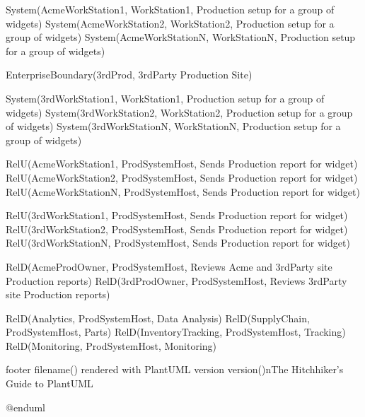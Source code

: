 \documentclass[letterpaper,10pt,english]{sphinxmanual}
\begin{document}
\begin{sphinxVerbatim}[commandchars=\\\{\},numbers=left,firstnumber=1,stepnumber=1]
    System(AcmeWorkStation1, \PYGZdq{}WorkStation1\PYGZdq{}, \PYGZdq{} Production setup for a group of widgets\PYGZdq{})    
    System(AcmeWorkStation2, \PYGZdq{}WorkStation2\PYGZdq{}, \PYGZdq{} Production setup for a group of widgets\PYGZdq{})        
    System(AcmeWorkStationN, \PYGZdq{}WorkStationN\PYGZdq{}, \PYGZdq{} Production setup for a group of widgets\PYGZdq{})        

\PYGZcb{}


Enterprise\PYGZus{}Boundary(3rdProd, \PYGZdq{}3rdParty Production Site\PYGZdq{}) \PYGZob{}


    System(3rdWorkStation1, \PYGZdq{}WorkStation1\PYGZdq{}, \PYGZdq{} Production setup for a group of widgets\PYGZdq{})    
    System(3rdWorkStation2, \PYGZdq{}WorkStation2\PYGZdq{}, \PYGZdq{} Production setup for a group of widgets\PYGZdq{})        
    System(3rdWorkStationN, \PYGZdq{}WorkStationN\PYGZdq{}, \PYGZdq{} Production setup for a group of widgets\PYGZdq{})     
\PYGZcb{}


Rel\PYGZus{}U(AcmeWorkStation1, ProdSystemHost, \PYGZdq{}Sends Production report for widget\PYGZdq{})
Rel\PYGZus{}U(AcmeWorkStation2, ProdSystemHost, \PYGZdq{}Sends Production report for widget\PYGZdq{})
Rel\PYGZus{}U(AcmeWorkStationN, ProdSystemHost, \PYGZdq{}Sends Production report for widget\PYGZdq{})


Rel\PYGZus{}U(3rdWorkStation1, ProdSystemHost, \PYGZdq{}Sends Production report for widget\PYGZdq{})
Rel\PYGZus{}U(3rdWorkStation2, ProdSystemHost, \PYGZdq{}Sends Production report for widget\PYGZdq{})
Rel\PYGZus{}U(3rdWorkStationN, ProdSystemHost, \PYGZdq{}Sends Production report for widget\PYGZdq{})





Rel\PYGZus{}D(AcmeProdOwner, ProdSystemHost, \PYGZdq{}Reviews Acme and 3rdParty site Production reports\PYGZdq{})
Rel\PYGZus{}D(3rdProdOwner, ProdSystemHost, \PYGZdq{}Reviews 3rdParty site Production reports\PYGZdq{})


Rel\PYGZus{}D(Analytics, ProdSystemHost, \PYGZdq{}Data Analysis\PYGZdq{})
Rel\PYGZus{}D(SupplyChain, ProdSystemHost, \PYGZdq{}Parts\PYGZdq{})
Rel\PYGZus{}D(InventoryTracking, ProdSystemHost, \PYGZdq{}Tracking\PYGZdq{})
Rel\PYGZus{}D(Monitoring, ProdSystemHost, \PYGZdq{}Monitoring\PYGZdq{})

footer \PYGZpc{}filename() rendered with PlantUML version \PYGZpc{}version()\PYGZbs{}nThe Hitchhiker’s Guide to PlantUML

@enduml
\end{sphinxVerbatim}
\end{document}
